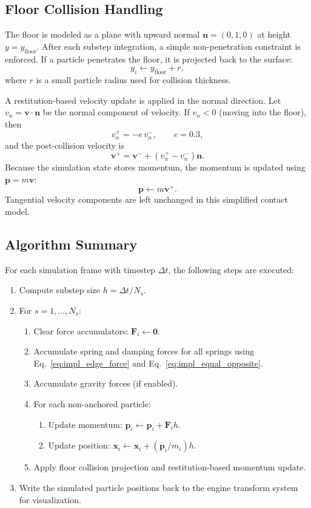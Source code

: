 \documentclass[manuscript,nonacm,12pt,letterpaper]{acmart}
\begin{document}
\subsection{Floor Collision Handling}
\label{Sec6.5:FloorColl}

The floor is modeled as a plane with upward normal $\mathbf{n}=(0,1,0)$ at height $y=y_{\text{floor}}$. After each substep integration, a simple non-penetration constraint is enforced. If a particle penetrates the floor, it is projected back to the surface:
\[
y_i \leftarrow y_{\text{floor}} + r,
\]
where $r$ is a small particle radius used for collision thickness.

A restitution-based velocity update is applied in the normal direction. Let $v_n = \mathbf{v}\cdot \mathbf{n}$ be the normal component of velocity. If $v_n < 0$ (moving into the floor), then
\begin{equation}
v_n^{+} = -e\, v_n^{-},
\qquad e=0.3,
\label{eq:impl_collision_restitution}
\end{equation}
and the post-collision velocity is
\[
\mathbf{v}^{+} = \mathbf{v}^{-} + (v_n^{+}-v_n^{-})\mathbf{n}.
\]
Because the simulation state stores momentum, the momentum is updated using $\mathbf{p}=m\mathbf{v}$:
\[
\mathbf{p} \leftarrow m \mathbf{v}^{+}.
\]
Tangential velocity components are left unchanged in this simplified contact model.

\subsection{Algorithm Summary}
\label{Sec6.6:Summary}

For each simulation frame with timestep $\Delta t$, the following steps are executed:
\begin{enumerate}
    \item Compute substep size $h = \Delta t/N_s$.
    \item For $s=1,\dots,N_s$:
    \begin{enumerate}
        \item Clear force accumulators: $\mathbf{F}_i \leftarrow \mathbf{0}$.
        \item Accumulate spring and damping forces for all springs using Eq.~\eqref{eq:impl_edge_force} and Eq.~\eqref{eq:impl_equal_opposite}.
        \item Accumulate gravity forces (if enabled).
        \item For each non-anchored particle:
        \begin{enumerate}
            \item Update momentum: $\mathbf{p}_i \leftarrow \mathbf{p}_i + \mathbf{F}_i h$.
            \item Update position: $\mathbf{x}_i \leftarrow \mathbf{x}_i + (\mathbf{p}_i/m_i) h$.
        \end{enumerate}
        \item Apply floor collision projection and restitution-based momentum update.
    \end{enumerate}
    \item Write the simulated particle positions back to the engine transform system for visualization.
\end{enumerate}
\end{document}
